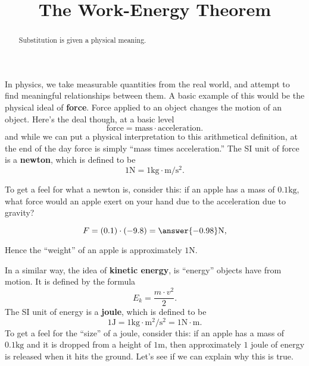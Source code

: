 \documentclass{ximera}
\title[Dig-In:]{The Work-Energy Theorem}
\begin{document}
\begin{abstract}
  Substitution is given a physical meaning. 
\end{abstract}
\maketitle

In physics, we take measurable quantities from the real world, and
attempt to find meaningful relationships between them. A basic example
of this would be the physical ideal of \textbf{force}. Force applied to an
object changes the motion of an object. Here's the deal though, at a
basic level
\[
\mathrm{force} = \mathrm{mass} \cdot \mathrm{acceleration}.
\]
and while we can put a physical interpretation to this arithmetical
definition, at the end of the day force is simply ``mass times
acceleration.'' The SI unit of force is a \textbf{newton}, which is defined to be
\[
1\mathrm{N} = 1\mathrm{kg}\cdot \mathrm{m}/\mathrm{s}^2. 
\]
\begin{question}
  To get a feel for what a newton is, consider this: if an apple has a
  mass of $0.1\mathrm{kg}$, what force would an apple exert on your hand
  due to the acceleration due to gravity?
  \begin{prompt}
  \[
  F = (0.1) \cdot (-9.8) = \answer{-0.98}\mathrm{N},
  \]
  \end{prompt}
\begin{feedback}
  Hence the ``weight'' of an apple is approximately $1\mathrm{N}$.
\end{feedback}
\end{question}


In a similar way, the idea of \textbf{kinetic energy}, is ``energy''
objects have from motion. It is defined by the formula
\[
E_k = \frac{m \cdot v^2}{2}.
\]
The SI unit of energy is a \textbf{joule}, which is defined to be
\[
1\mathrm{J} = 1\mathrm{kg}\cdot \mathrm{m}^2/\mathrm{s}^2 = 1\mathrm{N}\cdot\mathrm{m}. 
\]
To get a feel for the ``size'' of a joule, consider this: if an apple
has a mass of $0.1\mathrm{kg}$ and it is dropped from a height of
$1\mathrm{m}$, then approximately $1$ joule of energy is released when
it hits the ground. Let's see if we can explain why this is true.
\end{document}
